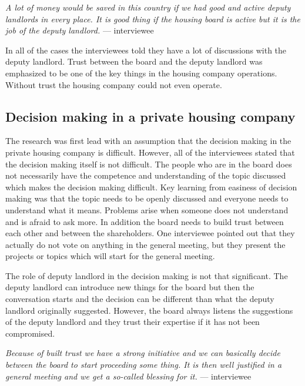 \begin{displayquote}
\textit{A lot of money would be saved in this country if we had good
and active deputy landlords in every place. It is good thing if the
housing board is active but it is the job of the deputy landlord.} --- interviewee
\end{displayquote}

In all of the cases the interviewees told they have a lot of discussions with the deputy landlord. Trust between the board and the deputy landlord was emphasized to be one of the key things in the housing company operations. Without trust the housing company could not even operate.

\subsection{Decision making in a private housing company}

The research was first lead with an assumption that the decision making in the private housing company is difficult. However, all of the interviewees stated that the decision making itself is not difficult. The people who are in the board does not necessarily have the competence and understanding of the topic discussed which makes the decision making difficult. Key learning from easiness of decision making was that the topic needs to be openly discussed and everyone needs to understand what it means. Problems arise when someone does not understand and is afraid to ask more. In addition the board needs to build trust between each other and between the shareholders. One interviewee pointed out that they actually do not vote on anything in the general meeting, but they present the projects or topics which will start for the general meeting.

The role of deputy landlord in the decision making is not that significant. The deputy landlord can introduce new things for the board but then the conversation starts and the decision can be different than what the deputy landlord originally suggested. However, the board always listens the suggestions of the deputy landlord and they trust their expertise if it has not been compromised.

\begin{displayquote}
\textit{Because of built trust we have a strong initiative and we can basically decide between the board to start proceeding some thing. It is then well justified in a general meeting and we get a so-called blessing for it.} --- interviewee
\end{displayquote}

